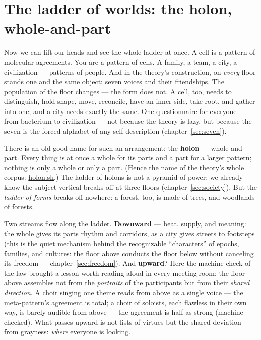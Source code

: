\documentclass[11pt,letterpaper]{article}
\newcommand{\holonsh}{\href{https://holon.sh}{holon.sh}\xspace}
\begin{document}
\section{The ladder of worlds: the holon, whole-and-part}
\label{sec:worlds}

Now we can lift our heads and see the whole ladder at once. A cell is
a pattern of molecular agreements. You are a pattern of cells. A
family, a team, a city, a civilization --- patterns of people. And in
the theory's construction, on \emph{every} floor stands one and the
same object: seven voices and their friendships. The population of
the floor changes --- the form does not. A cell, too, needs to
distinguish, hold shape, move, reconcile, have an inner side, take
root, and gather into one; and a city needs exactly the same. One
questionnaire for everyone --- from bacterium to civilization --- not
because the theory is lazy, but because the seven is the forced
alphabet of any self-description (chapter~\ref{sec:seven}).

There is an old good name for such an arrangement: the
\textbf{holon} --- whole-and-part. Every thing is at once a whole for
its parts and a part for a larger pattern; nothing is only a whole or
only a part. (Hence the name of the theory's whole corpus:
\holonsh.) The ladder of holons is not a pyramid of power: we already
know the subject vertical breaks off at three floors
(chapter~\ref{sec:society}). But the \emph{ladder of forms} breaks
off nowhere: a forest, too, is made of trees, and woodlands of
forests.

Two streams flow along the ladder. \textbf{Downward} --- beat,
supply, and meaning: the whole gives its parts rhythm and corridors,
as a city gives streets to footsteps (this is the quiet mechanism
behind the recognizable ``characters'' of epochs, families, and
cultures: the floor above conducts the floor below without canceling
its freedom --- chapter~\ref{sec:freedom}). And \textbf{upward}? Here
the machine check of the law brought a lesson worth reading aloud in
every meeting room: the floor above assembles not from the
\emph{portraits} of the participants but from their \emph{shared
direction}. A choir singing one theme reads from above as a single
voice --- the meta-pattern's agreement is total; a choir of
soloists, each flawless in their own way, is barely audible from
above --- the agreement is half as strong (machine checked). What
passes upward is not lists of virtues but the shared deviation from
grayness: \emph{where} everyone is looking.
\end{document}
